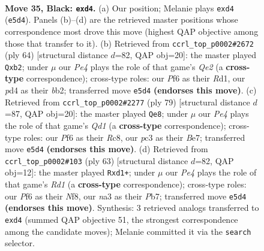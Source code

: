 \documentclass[11pt]{article}
\begin{document}
\clearpage

\begin{figure}[p]\centering
\begin{subfigure}{0.46\textwidth}\centering
\resizebox{\linewidth}{!}{%
\newchessgame
\chessboard[
  setfen={3qn2r/3b2k1/p4p2/n3p1pp/PQ1PP3/N1P5/B4PPP/R3K1N1 b - - 1 35},
  showmover=false,
  pgfstyle=straightmove, color=movearrow, markmove={e5-d4}
]}
\caption{}
\end{subfigure}\hfill
\begin{subfigure}{0.46\textwidth}\centering
\resizebox{\linewidth}{!}{%
\newchessgame
\chessboard[
  setfen={2r3k1/pp1n1p1p/4p1q1/1P1n4/8/P4NBP/1b2QPP1/3R2K1 w - - 0 33},
  showmover=false,
  pgfstyle=straightmove, color=movearrow, markmove={e2-b2}
]}
\caption{}
\end{subfigure}
\\[4pt]
\begin{subfigure}{0.46\textwidth}\centering
\resizebox{\linewidth}{!}{%
\newchessgame
\chessboard[
  setfen={2rq2k1/4bppn/1p2p2p/1Nn1P3/2P4P/P4BP1/3RQB1K/8 b - - 0 40},
  showmover=false,
  pgfstyle=straightmove, color=movearrow, markmove={d8-e8}
]}
\caption{}
\end{subfigure}\hfill
\begin{subfigure}{0.46\textwidth}\centering
\resizebox{\linewidth}{!}{%
\newchessgame
\chessboard[
  setfen={3r1nk1/1p2nqp1/1p3p1p/1Pp5/P3P3/2B1NPP1/1Q5P/3R2K1 b - - 0 32},
  showmover=false,
  pgfstyle=straightmove, color=movearrow, markmove={d8-d1}
]}
\caption{}
\end{subfigure}
\caption{\textbf{Move 35, Black: \texttt{exd4}.} (a) Our position; Melanie plays \texttt{exd4} (\texttt{e5d4}). Panels (b)--(d) are the retrieved master positions whose correspondence most drove this move (highest QAP objective among those that transfer to it). (b) Retrieved from \texttt{ccrl\_top\_p0002\#2672} (ply 64) [structural distance $d$=82, QAP obj=20]: the master played \texttt{Qxb2}; under $\mu$ our \emph{Pe4} plays the role of that game's \emph{Qe2} (a \textbf{cross-type} correspondence); cross-type roles: our \emph{P}f6 as their \emph{R}d1, our \emph{p}d4 as their \emph{b}b2; transferred move \texttt{e5d4} \textbf{(endorses this move)}. (c) Retrieved from \texttt{ccrl\_top\_p0002\#2277} (ply 79) [structural distance $d$=87, QAP obj=20]: the master played \texttt{Qe8}; under $\mu$ our \emph{Pe4} plays the role of that game's \emph{Qd1} (a \textbf{cross-type} correspondence); cross-type roles: our \emph{P}f6 as their \emph{R}c8, our \emph{p}c3 as their \emph{B}e7; transferred move \texttt{e5d4} \textbf{(endorses this move)}. (d) Retrieved from \texttt{ccrl\_top\_p0002\#103} (ply 63) [structural distance $d$=82, QAP obj=12]: the master played \texttt{Rxd1+}; under $\mu$ our \emph{Pe4} plays the role of that game's \emph{Rd1} (a \textbf{cross-type} correspondence); cross-type roles: our \emph{P}f6 as their \emph{N}f8, our \emph{n}a3 as their \emph{P}b7; transferred move \texttt{e5d4} \textbf{(endorses this move)}. Synthesis: 3 retrieved analogs transferred to \texttt{exd4} (summed QAP objective 51, the strongest correspondence among the candidate moves); Melanie committed it via the \texttt{search} selector.}
\label{fig:thought-m69}
\end{figure}
\end{document}
